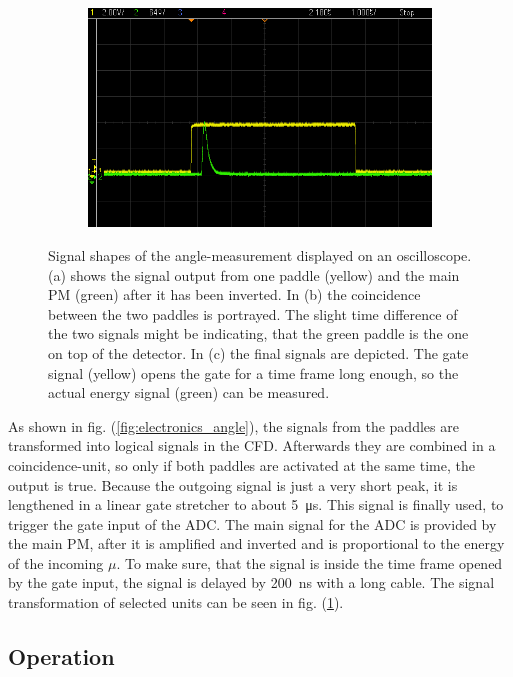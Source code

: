 \begin{figure}[ht]
\begin{subfigure}{0.32\textwidth}
			\includegraphics[width=\textwidth]{img/Winkel/scope_8.png}
			\subcaption{}
		\end{subfigure}
		
		\caption{Signal shapes of the angle-measurement displayed on an oscilloscope.
		(a) shows the signal output from one paddle (yellow) and the main PM (green) after it has been inverted.
		In (b) the coincidence between the two paddles is portrayed. The slight time difference of the two signals might be indicating, that the green paddle is the one on top of the detector.
		In (c) the final signals are depicted. The gate signal (yellow) opens the gate for a time frame long enough, so the actual energy signal (green) can be measured.
	}
		\label{fig:signal_angle}
	\end{figure}

	As shown in fig. (\ref{fig:electronics_angle}), the signals from the paddles are transformed into logical signals in the CFD.
	Afterwards they are combined in a coincidence-unit, so only if both paddles are activated at the same time, the output is true.
	Because the outgoing signal is just a very short peak, it is lengthened in a linear gate stretcher to about \SI{5}{\micro\second}.
	This signal is finally used, to trigger the gate input of the ADC.
	The main signal for the ADC is provided by the main PM, after it is amplified and inverted and is proportional to the energy of the incoming $\mu$.
	To make sure, that the signal is inside the time frame opened by the gate input, the signal is delayed by \SI{200}{\nano\second} with a long cable.
	The signal transformation of selected units can be seen in fig. (\ref{fig:signal_angle}).
	
\subsection{Operation}

